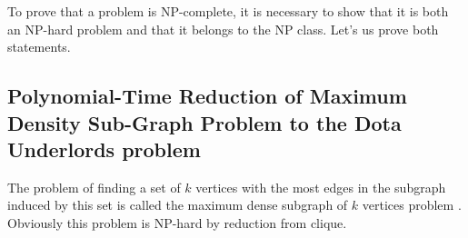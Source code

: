 \documentclass[smallextended]{svjour3}       %
\begin{document}
To prove that a problem is NP-complete, it is necessary to show that it is both an NP-hard problem and that it belongs to the NP class. Let's us prove both statements.

\subsection{Polynomial-Time Reduction of Maximum Density Sub-Graph Problem to the Dota Underlords problem}

The problem of finding a set of $k$ vertices with the most edges in the subgraph induced by this set is called the maximum dense subgraph of $k$ vertices problem \cite{kortsarz1993choosing}.  Obviously this problem is NP-hard by reduction from clique. 

\end{document}
